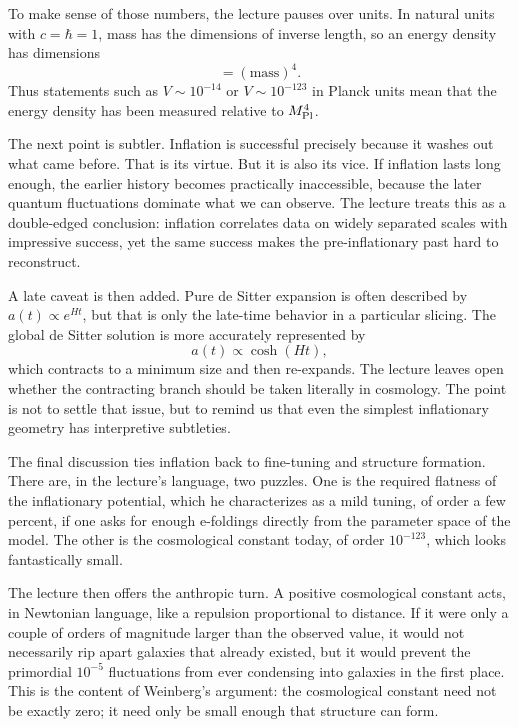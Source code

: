 To make sense of those numbers, the lecture pauses over units. In natural units with \(c=\hbar=1\), mass has the dimensions of inverse length, so an energy density has dimensions
\begin{equation}
[\rho]=(\text{mass})^4.
\end{equation}
Thus statements such as \(V\sim 10^{-14}\) or \(V\sim 10^{-123}\) in Planck units mean that the energy density has been measured relative to \(M_{\rm Pl}^4\).

The next point is subtler. Inflation is successful precisely because it washes out what came before. That is its virtue. But it is also its vice. If inflation lasts long enough, the earlier history becomes practically inaccessible, because the later quantum fluctuations dominate what we can observe. The lecture treats this as a double-edged conclusion: inflation correlates data on widely separated scales with impressive success, yet the same success makes the pre-inflationary past hard to reconstruct.

A late caveat is then added. Pure de Sitter expansion is often described by \(a(t)\propto e^{Ht}\), but that is only the late-time behavior in a particular slicing. The global de Sitter solution is more accurately represented by
\begin{equation}
a(t)\propto \cosh(Ht),
\end{equation}
which contracts to a minimum size and then re-expands. The lecture leaves open whether the contracting branch should be taken literally in cosmology. The point is not to settle that issue, but to remind us that even the simplest inflationary geometry has interpretive subtleties.

The final discussion ties inflation back to fine-tuning and structure formation. There are, in the lecture's language, two puzzles. One is the required flatness of the inflationary potential, which he characterizes as a mild tuning, of order a few percent, if one asks for enough e-foldings directly from the parameter space of the model. The other is the cosmological constant today, of order \(10^{-123}\), which looks fantastically small.

The lecture then offers the anthropic turn. A positive cosmological constant acts, in Newtonian language, like a repulsion proportional to distance. If it were only a couple of orders of magnitude larger than the observed value, it would not necessarily rip apart galaxies that already existed, but it would prevent the primordial \(10^{-5}\) fluctuations from ever condensing into galaxies in the first place. This is the content of Weinberg's argument: the cosmological constant need not be exactly zero; it need only be small enough that structure can form.

